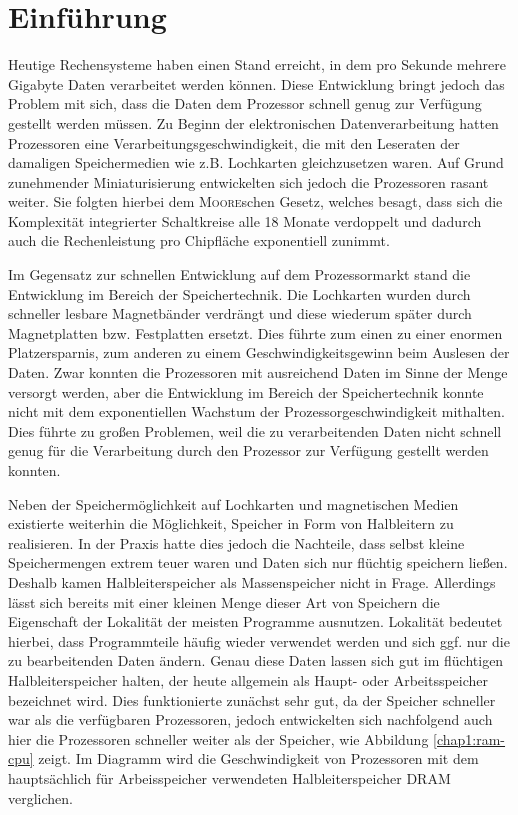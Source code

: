 \chapter{Einführung}
\label{chap1}

Heutige Rechensysteme haben einen Stand erreicht, in dem pro Sekunde mehrere Gigabyte Daten verarbeitet werden können. Diese Entwicklung bringt jedoch das
Problem mit sich, dass die Daten dem Prozessor schnell genug zur Verfügung gestellt werden müssen. Zu Beginn der elektronischen Datenverarbeitung hatten
Prozessoren eine Verarbeitungsgeschwindigkeit, die mit den Leseraten der damaligen Speichermedien wie z.B. Lochkarten gleichzusetzen waren. Auf Grund zunehmender
Miniaturisierung entwickelten sich jedoch die Prozessoren rasant weiter. Sie folgten hierbei dem \textsc{Moore}schen Gesetz, welches besagt, dass sich die
Komplexität integrierter Schaltkreise alle 18 Monate verdoppelt und dadurch auch die Rechenleistung pro Chipfläche exponentiell zunimmt.

Im Gegensatz zur schnellen Entwicklung auf dem Prozessormarkt stand  die Entwicklung im Bereich der Speichertechnik. Die Lochkarten wurden durch schneller
lesbare Magnetbänder verdrängt und diese wiederum später durch Magnetplatten bzw. Festplatten ersetzt. Dies führte zum einen zu einer enormen Platzersparnis, zum
anderen zu einem Geschwindigkeitsgewinn beim Auslesen der Daten. Zwar konnten die Prozessoren mit ausreichend Daten im Sinne der Menge versorgt werden,
aber die Entwicklung im Bereich der Speichertechnik konnte nicht mit dem exponentiellen Wachstum der Prozessorgeschwindigkeit mithalten. Dies führte zu großen
Problemen, weil die zu verarbeitenden Daten nicht schnell genug für die Verarbeitung durch den Prozessor zur Verfügung gestellt werden konnten.

Neben der Speichermöglichkeit auf Lochkarten und magnetischen Medien existierte weiterhin die Möglichkeit, Speicher in Form von Halbleitern zu realisieren. In
der Praxis hatte dies jedoch die Nachteile, dass selbst kleine Speichermengen extrem teuer waren und Daten sich nur flüchtig speichern ließen. Deshalb kamen
Halbleiterspeicher als Massenspeicher nicht in Frage. Allerdings lässt sich bereits mit einer kleinen Menge dieser Art von Speichern die Eigenschaft der
Lokalität der meisten Programme ausnutzen. Lokalität bedeutet hierbei, dass Programmteile häufig wieder verwendet werden und sich ggf. nur die zu bearbeitenden Daten
ändern. Genau diese Daten lassen sich gut im flüchtigen Halbleiterspeicher halten, der heute allgemein als Haupt- oder Arbeitsspeicher bezeichnet wird. Dies
funktionierte zunächst sehr gut, da der Speicher schneller war als die verfügbaren Prozessoren, jedoch entwickelten sich nachfolgend auch hier die Prozessoren
schneller weiter als der Speicher, wie Abbildung \ref{chap1:ram-cpu} zeigt. Im Diagramm wird die Geschwindigkeit von Prozessoren mit dem hauptsächlich für
Arbeisspeicher verwendeten Halbleiterspeicher DRAM verglichen.

